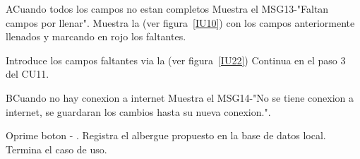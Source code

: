 \begin{UCtrayectoriaA}{A}{Cuando todos los campos no estan completos}
	\UCpaso Muestra el MSG13-"Faltan campos por llenar".
	\UCpaso Muestra la (ver figura~\ref{IU10}) con los campos anteriormente llenados y marcando en rojo los faltantes.
	\item\UCactor Introduce los campos faltantes via la (ver figura~\ref{IU22}) 
	\UCpaso Continua en el paso 3 del CU11.
\end{UCtrayectoriaA}

\begin{UCtrayectoriaA}{B}{Cuando no hay conexion a internet}
	\UCpaso Muestra el MSG14-"No se tiene conexion a internet, se guardaran los cambios hasta su nueva conexion.".
	\item\UCactor Oprime boton - .
	\UCpaso Registra el albergue propuesto  en la base de datos local.	
	\UCpaso[] Termina el caso de uso.
\end{UCtrayectoriaA}
 